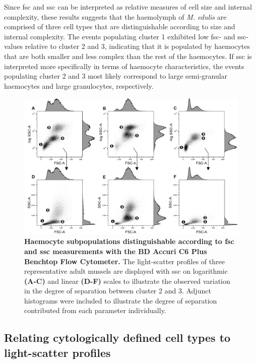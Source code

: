 Since \acrshort{fsc} and \acrshort{ssc} can be interpreted as relative measures of cell size and internal complexity, these results suggests that the haemolymph of \emph{M. edulis} are comprised of three cell types that are distinguishable according to size and internal complexity. The events populating cluster 1 exhibited low \acrshort{fsc}- and \acrshort{ssc}-values relative to cluster 2 and 3, indicating that it is populated by haemocytes that are both smaller and less complex than the rest of the haemocytes. If \acrshort{ssc} is interpreted more specifically in terms of haemocyte characteristics, the events populating cluster 2 and 3 most likely correspond to large semi-granular haemocytes and large granulocytes, respectively.

\begin{figure}[ht!]
    \centering
    \includegraphics[width=1.0\textwidth]{figures/Gating strategy/The three musceteers.pdf}
    \caption{\textbf{Haemocyte subpopulations distinguishable according to \acrshort{fsc} and \acrshort{ssc} measurements with the BD Accuri C6 Plus Benchtop Flow Cytometer.} The light-scatter profiles of three representative adult mussels are displayed with \acrshort{ssc} on logarithmic \textbf{(A-C)} and linear \textbf{(D-F)} scales to illustrate the observed variation in the degree of separation between cluster 2 and 3. Adjunct histograms were included to illustrate the degree of separation contributed from each parameter individually.}
    \label{fig:fsc_vs_ssc}
\end{figure}

\subsection{Relating cytologically defined cell types to light-scatter profiles}
\label{subsection:evidence}

